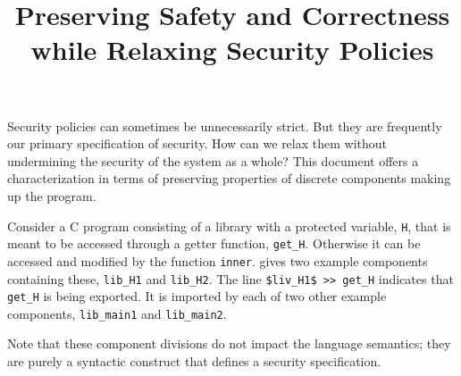 \documentclass{article}
\title{Preserving Safety and Correctness while Relaxing Security Policies}
\begin{document}
\maketitle

Security policies can sometimes be unnecessarily strict. But they are frequently
our primary specification of security. How can we relax them without undermining
the security of the system as a whole? This document offers a characterization in
terms of preserving properties of discrete components making up the program.

Consider a C program consisting of a library with a protected variable, {\tt H},
that is meant to be accessed through a getter function, {\tt get\_H}. Otherwise
it can be accessed and modified by the function {\tt inner}. 
gives two example components containing these, {\tt lib\_H1} and {\tt lib\_H2}.
The line {\tt \$liv\_H1\$ >> get\_H} indicates that {\tt get\_H} is being
exported. It is imported by each of two other example components, {\tt lib\_main1}
and {\tt lib\_main2}.

Note that these component divisions do not impact the language semantics; they are
purely a syntactic construct that defines a security specification.

\vspace{\abovedisplayskip}
\end{document}
